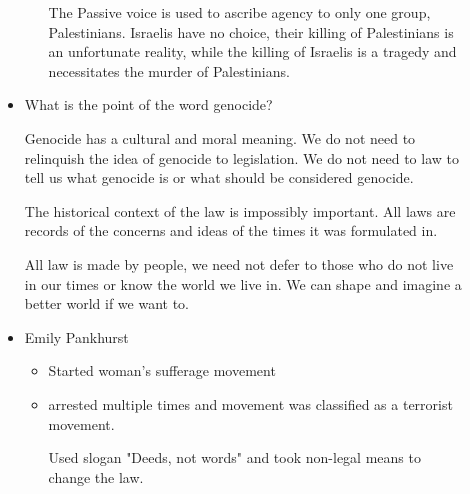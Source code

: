 \documentclass{report}
\begin{document}
\begin{description}
\begin{itemize}
\begin{itemize}
\begin{mdframed}
                            The Passive voice is used to ascribe
                            agency to only one group,
                            Palestinians. Israelis have no
                            choice, their killing of Palestinians
                            is an unfortunate reality, while
                            the killing of Israelis is a
                            tragedy and necessitates the murder
                            of Palestinians.
                        \end{mdframed}
                \end{itemize}
            \item What is the point of the word genocide?
                \begin{mdframed}
                    Genocide has a cultural and moral meaning.
                    We do not need to relinquish the idea
                    of genocide to legislation. We do not
                    need to law to tell us what genocide is
                    or what should be considered genocide.
                \end{mdframed}
                \begin{mdframed}
                    The historical context of the law
                    is impossibly important. All laws
                    are records of the concerns and ideas
                    of the times it was formulated in.
                \end{mdframed}
                \begin{mdframed}
                    All law is made by people, we need not
                    defer to those who do not live in our times
                    or know the world we live in. We can
                    shape and imagine a better world if we
                    want to.
                \end{mdframed}
            \item Emily Pankhurst
                \begin{itemize}
                    \item Started woman's sufferage movement
                    \item arrested multiple times and movement
                        was classified as a terrorist
                        movement.
                        \begin{mdframed}
                            Used slogan "Deeds, not words"
                            and took non-legal means to 
                            change the law.


\end{mdframed}
\end{itemize}
\end{itemize}
\end{description}
\end{document}
